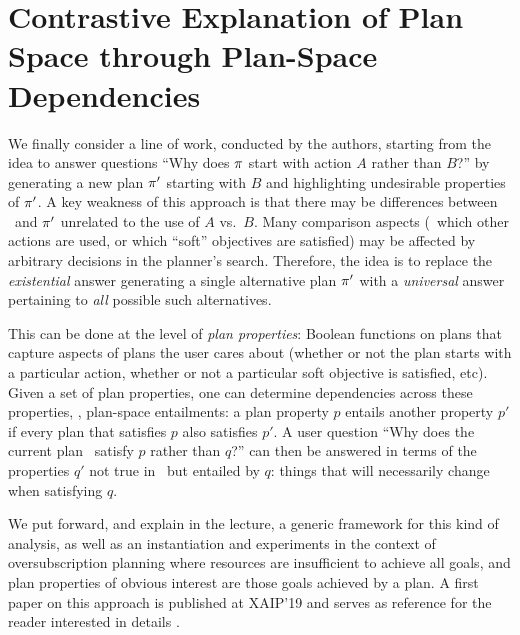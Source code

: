 \section{Contrastive Explanation of Plan Space through Plan-Space Dependencies}
\label{xpp}

We finally consider a line of work, conducted by the authors, starting
from the idea to answer questions ``Why does $\pi$ start with action
$A$ rather than $B$?'' by generating a new plan $\pi'$ starting with
$B$ and highlighting undesirable properties of $\pi'$. A key
weakness of this approach is that there may be differences between
\plan\ and $\pi'$ unrelated to the use of $A$ vs.\ $B$. Many
comparison aspects (\eg\ which other actions are used, or which
``soft'' objectives are satisfied) may be affected by arbitrary
decisions in the planner's search. Therefore, the idea is to replace
the \emph{existential} answer generating a single alternative plan
$\pi'$ with a \emph{universal} answer pertaining to \emph{all}
possible such alternatives.

This can be done at the level of \emph{plan properties}: Boolean
functions on plans that capture aspects of plans the user cares about
(whether or not the plan starts with a particular action, whether or
not a particular soft objective is satisfied, etc). Given a set of
plan properties, one can determine dependencies across these
properties, \ie, plan-space entailments: a plan property $p$ entails
another property $p'$ if every plan that satisfies $p$ also satisfies
$p'$. A user question ``Why does the current plan \plan\ satisfy $p$
rather than $q$?'' can then be answered in terms of the properties
$q'$ not true in \plan\ but entailed by $q$: things that will
necessarily change when satisfying $q$.

We put forward, and explain in the lecture, a generic framework for
this kind of analysis, as well as an instantiation and experiments in
the context of oversubscription planning
\cite{smith:icaps-04,domshlak:mirkis:jair-15} where resources are
insufficient to achieve all goals, and plan properties of obvious
interest are those goals achieved by a plan. A first paper on this
approach is published at XAIP'19 and serves as reference for the
reader interested in details \cite{eifler:etal:xaip-19}.
